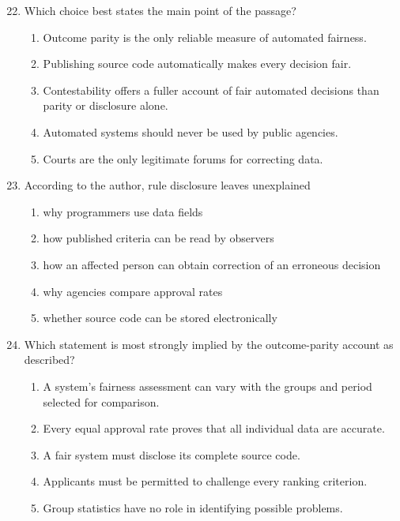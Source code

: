\begin{enumerate}\setcounter{enumi}{21}
\item Which choice best states the main point of the passage?
\begin{enumerate}
\item Outcome parity is the only reliable measure of automated fairness.
\item Publishing source code automatically makes every decision fair.
\item Contestability offers a fuller account of fair automated decisions than parity or disclosure alone.
\item Automated systems should never be used by public agencies.
\item Courts are the only legitimate forums for correcting data.
\end{enumerate}

\item According to the author, rule disclosure leaves unexplained
\begin{enumerate}
\item why programmers use data fields
\item how published criteria can be read by observers
\item how an affected person can obtain correction of an erroneous decision
\item why agencies compare approval rates
\item whether source code can be stored electronically
\end{enumerate}

\item Which statement is most strongly implied by the outcome-parity account as described?
\begin{enumerate}
\item A system's fairness assessment can vary with the groups and period selected for comparison.
\item Every equal approval rate proves that all individual data are accurate.
\item A fair system must disclose its complete source code.
\item Applicants must be permitted to challenge every ranking criterion.
\item Group statistics have no role in identifying possible problems.
\end{enumerate}


\end{enumerate}
